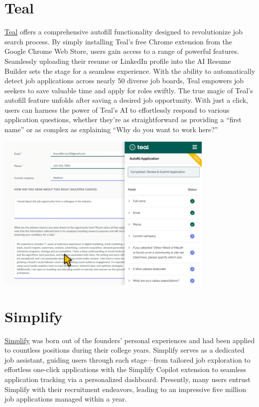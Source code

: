 \documentclass[
]{book}
\begin{document}
\hypertarget{teal}{%
\section{Teal}\label{teal}}

\href{https://www.tealhq.com/tools/autofill-job-applications}{Teal} offers a comprehensive autofill functionality designed to revolutionize job search process. By simply installing Teal's free Chrome extension from the Google Chrome Web Store, users gain access to a range of powerful features. Seamlessly uploading their resume or LinkedIn profile into the AI Resume Builder sets the stage for a seamless experience. With the ability to automatically detect job applications across nearly 50 diverse job boards, Teal empowers job seekers to save valuable time and apply for roles swiftly. The true magic of Teal's autofill feature unfolds after saving a desired job opportunity. With just a click, users can harness the power of Teal's AI to effortlessly respond to various application questions, whether they're as straightforward as providing a ``first name'' or as complex as explaining ``Why do you want to work here?''

\includegraphics[width=4.125in,height=\textheight]{teal pic.png}

\hypertarget{simplify}{%
\section{Simplify}\label{simplify}}

\href{https://simplify.jobs/autofill\#how-it-works}{Simplify} was born out of the founders' personal experiences and had been applied to countless positions during their college years. Simplify serves as a dedicated job assistant, guiding users through each stage---from tailored job exploration to effortless one-click applications with the Simplify Copilot extension to seamless application tracking via a personalized dashboard. Presently, many users entrust Simplify with their recruitment endeavors, leading to an impressive five million job applications managed within a year.~
\end{document}
